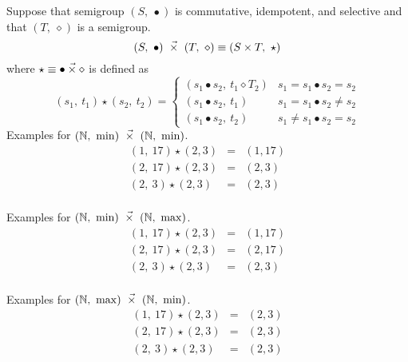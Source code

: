 Suppose that semigroup $(S,\ \bullet)$ is commutative, idempotent, and selective 
and that $(T,\ \diamond)$ is a semigroup. 
\[
(S,\ \bullet)\ \lexprod\ (T,\ \diamond) \equiv (S \times T,\ \star)
\]
where $\star \equiv \bullet\mathbin{\vec{\times}}\diamond$ is defined as 
\[
  (s_1,\ t_1) \star (s_2,\ t_2) =
        \begin{cases}
          (s_1 \bullet s_2,\ t_1 \diamond T_2)   & s_1 = s_1 \bullet s_2 = s_2 \\
          (s_1 \bullet s_2,\ t_1)                & s_1 = s_1 \bullet s_2 \neq s_2 \\
          (s_1 \bullet s_2,\ t_2)                & s_1 \neq s_1 \bullet s_2 = s_2 
        \end{cases}
\]
Examples for $(\mathbb{N},\ \min)\ \mathbin{\vec{\times}}\ (\mathbb{N},\ \min)$. 
\[
\begin{array}{rcl}
(1,\ 17) \star (2, 3) & = & (1, 17) \\ 
(2,\ 17) \star (2, 3) & = & (2, 3) \\ 
(2,\ 3)  \star (2, 3) & = & (2, 3) \\ 
\end{array} 
\] 

Examples for $(\NN,\ \min)\ \lexprod\ (\NN,\ \max)$. 
\[
\begin{array}{rcl}
(1,\ 17) \star (2, 3) & = & (1, 17) \\ 
(2,\ 17) \star (2, 3) & = & (2, 17) \\ 
(2,\ 3)  \star (2, 3) & = & (2, 3) \\ 
\end{array} 
\] 

Examples for $(\NN,\ \max)\ \lexprod\ (\NN,\ \min)$. 
\[
\begin{array}{rcl}
(1,\ 17) \star (2, 3) & = & (2, 3) \\ 
(2,\ 17) \star (2, 3) & = & (2, 3) \\ 
(2,\ 3)  \star (2, 3) & = & (2, 3) \\ 
\end{array} 
\] 
